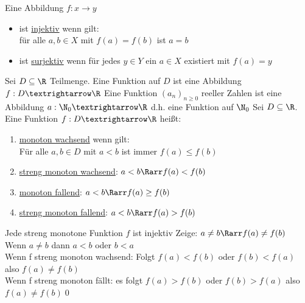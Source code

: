 %
\wdh
Eine Abbildung $f:x→y$\\
\begin{itemize}
\item{ist \underline{injektiv} wenn gilt:\\
für alle $a,b\in X$ mit $f(a)=f(b)$ ist $a=b$}
\item{ist \underline{surjektiv} wenn für jedes $y\in Y$ ein $a\in X$ existiert mit $f(a)=y$}
\end{itemize}
Sei $D\subseteq\R$ Teilmenge. Eine Funktion auf $D$ ist eine Abbildung $f:D→\R$
%
\bem
Eine Funktion $(a_n)_{n\geq 0}$ reeller Zahlen ist eine Abbildung $a:\N_0→\R$ d.h. eine Funktion auf $\N_0$
%
Sei $D\subseteq\R$. Eine Funktion  $f:D→\R$ heißt:
\begin{enumerate}
\item{\underline{monoton wachsend} wenn gilt:\\
Für alle $a,b\in D$ mit $a<b$ ist immer $f(a)\leq f(b)$}
\item{\underline{streng monoton wachsend}: $a<b\Rarr f(a)<f(b)$}
\item{\underline{monoton fallend}: $a<b\Rarr f(a)\geq f(b)$}
\item{\underline{streng monoton fallend}: $a<b\Rarr f(a)> f(b)$}
\end{enumerate}
%
\bem
Jede streng monotone Funktion $f$ ist injektiv
%
\bew
Zeige: $a\neq b\Rarr f(a)\neq f(b)$\\
Wenn $a\neq b$ dann $a< b$ oder $b<a$\\
Wenn f streng monoton wachsend: Folgt $f(a)< f(b)$ oder $f(b)< f(a)$ also $f(a)\neq f(b)$\\
Wenn f streng monoton fällt: es folgt $f(a)> f(b)$ oder $f(b)> f(a)$ also $f(a)\neq f(b)$\qed
%
